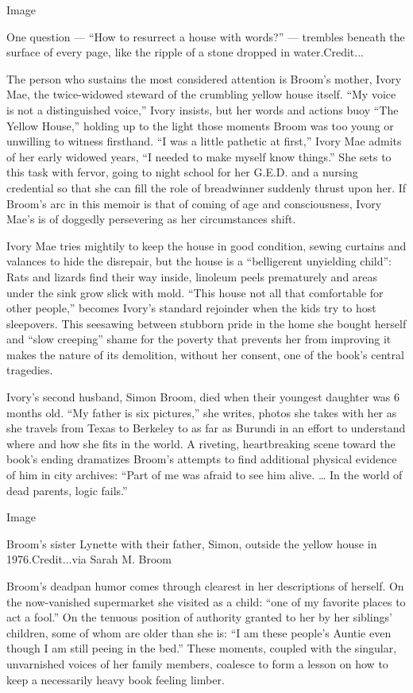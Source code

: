 Image

One question --- ``How to resurrect a house with words?'' --- trembles
beneath the surface of every page, like the ripple of a stone dropped in
water.Credit...

The person who sustains the most considered attention is Broom's mother,
Ivory Mae, the twice-widowed steward of the crumbling yellow house
itself. ``My voice is not a distinguished voice,'' Ivory insists, but
her words and actions buoy ``The Yellow House,'' holding up to the light
those moments Broom was too young or unwilling to witness firsthand. ``I
was a little pathetic at first,'' Ivory Mae admits of her early widowed
years, ``I needed to make myself know things.'' She sets to this task
with fervor, going to night school for her G.E.D. and a nursing
credential so that she can fill the role of breadwinner suddenly thrust
upon her. If Broom's arc in this memoir is that of coming of age and
consciousness, Ivory Mae's is of doggedly persevering as her
circumstances shift.

Ivory Mae tries mightily to keep the house in good condition, sewing
curtains and valances to hide the disrepair, but the house is a
``belligerent unyielding child'': Rats and lizards find their way
inside, linoleum peels prematurely and areas under the sink grow slick
with mold. ``This house not all that comfortable for other people,''
becomes Ivory's standard rejoinder when the kids try to host sleepovers.
This seesawing between stubborn pride in the home she bought herself and
``slow creeping'' shame for the poverty that prevents her from improving
it makes the nature of its demolition, without her consent, one of the
book's central tragedies.

Ivory's second husband, Simon Broom, died when their youngest daughter
was 6 months old. ``My father is six pictures,'' she writes, photos she
takes with her as she travels from Texas to Berkeley to as far as
Burundi in an effort to understand where and how she fits in the world.
A riveting, heartbreaking scene toward the book's ending dramatizes
Broom's attempts to find additional physical evidence of him in city
archives: ``Part of me was afraid to see him alive. \ldots{} In the
world of dead parents, logic fails.''

Image

Broom's sister Lynette with their father, Simon, outside the yellow
house in 1976.Credit...via Sarah M. Broom

Broom's deadpan humor comes through clearest in her descriptions of
herself. On the now-vanished supermarket she visited as a child: ``one
of my favorite places to act a fool.'' On the tenuous position of
authority granted to her by her siblings' children, some of whom are
older than she is: ``I am these people's Auntie even though I am still
peeing in the bed.'' These moments, coupled with the singular,
unvarnished voices of her family members, coalesce to form a lesson on
how to keep a necessarily heavy book feeling limber.

